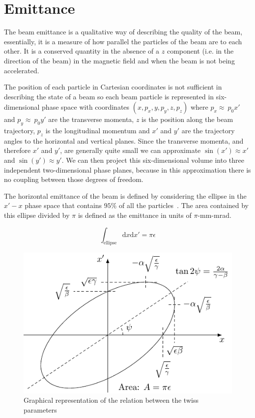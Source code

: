 \section{Emittance}

The beam emittance is a
qualitative way of describing the quality of the beam, essentially, it is a
measure of how parallel the particles of the beam are to each other.
It is a conserved
quantity in the absence of a \(z\) component (i.e. in the direction of the
beam) in the magnetic field and when the beam is not being accelerated.

The position of each particle in Cartesian coordinates is not sufficient in
describing the state of a beam so each beam particle is represented in
six-dimensional phase space with coordinates \(\left(x,p_x,y,p_y,z,p_z\right)\)
where \(p_x\approx~p_0x'\) and \(p_y\approx~p_0y'\) are the transverse momenta,
\(z\) is the position along the beam trajectory, \(p_z\) is the longitudinal
momentum and \(x'\) and \(y'\) are the trajectory angles to the horizontal and
vertical planes. Since the transverse momenta, and therefore \(x'\) and \(y'\),
are generally quite small we can approximate \(\sin\left(x'\right)\approx x'\)
and \(\sin\left(y'\right)\approx y'\). We can then project this six-dimensional
volume into three independent two-dimensional phase planes, because in this
approximation there is no coupling between those degrees of freedom.

The horizontal emittance of the beam is defined by considering the ellipse in
the \(x'-x\) phase space that contains \(95\%\) of all the
particles~\cite{buon1994beam}. The area contained by this ellipse divided by
\(\pi\) is defined as the emittance in units of \(\pi\)-mm-mrad.

\[ \int_{\text{ellipse}}\mathrm{d}x\mathrm{d}x' =\pi\epsilon \]

\begin{figure}[!t]
	\centering
	\includegraphics{figures/ellipse}
	\caption{
		Graphical representation of the relation between the twiss parameters
		\cite{caldwell2015rkk}}
	\label{fig:ellipse}
\end{figure}

